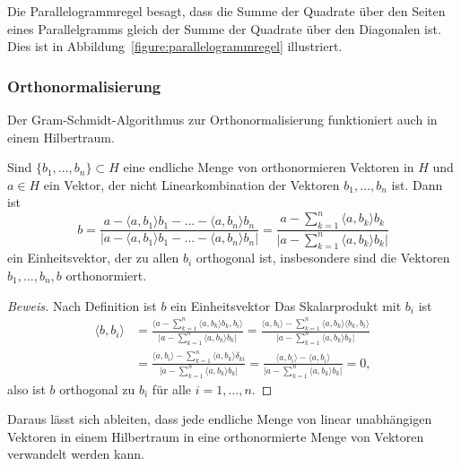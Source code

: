 Die Parallelogrammregel besagt, dass die Summe der Quadrate über den
Seiten eines Parallelgramms gleich der Summe der Quadrate über den
Diagonalen ist.
Dies ist in Abbildung~\ref{figure:parallelogrammregel} illustriert.

\subsubsection{Orthonormalisierung}
%
Der Gram-Schmidt-Algorithmus zur Orthonormalisierung funktioniert auch
%
in einem Hilbertraum.

\begin{satz}
\label{satz:orthonormierung}
Sind $\{b_1,\dots,b_n\}\subset H$ eine endliche Menge von orthonormieren
Vektoren in $H$ und $a\in H$ ein Vektor, der nicht Linearkombination
der Vektoren $b_1,\dots,b_n$ ist.
Dann ist
\[
b
=
\frac{a-\langle a,b_1\rangle b_1-\dots-\langle a,b_n\rangle b_n}%
{|a-\langle a,b_1\rangle b_1-\dots-\langle a,b_n\rangle b_n|}
=
\frac{a-\displaystyle\sum_{k=1}^n \langle a,b_k\rangle b_k}%
{\biggl| a-\displaystyle\sum_{k=1}^n \langle a,b_k\rangle b_k\biggr|}
\]
ein Einheitsvektor, der zu allen $b_i$ orthogonal ist, insbesondere sind
die Vektoren
$b_1,\dots,b_n,b$ orthonormiert.
\end{satz}

\begin{proof}[Beweis]
Nach Definition ist $b$ ein Einheitsvektor
Das Skalarprodukt mit $b_i$ ist
\begin{align*}
\langle b, b_i\rangle
&=
\frac{\biggl\langle a-\displaystyle\sum_{k=1}^n \langle a,b_k\rangle b_k,b_i\biggr\rangle}%
{\biggl| a-\displaystyle\sum_{k=1}^n \langle a,b_k\rangle b_k\biggr|}
=
\frac{\langle a,b_i\rangle-\displaystyle\sum_{k=1}^n \langle a,b_k\rangle \langle b_k,b_i\rangle}%
{\biggl| a-\displaystyle\sum_{k=1}^n \langle a,b_k\rangle b_k\biggr|}
\\
&=
\frac{\langle a,b_i\rangle-\displaystyle\sum_{k=1}^n \langle a,b_k\rangle \delta_{ki}}%
{\biggl| a-\displaystyle\sum_{k=1}^n \langle a,b_k\rangle b_k\biggr|}
=
\frac{\langle a,b_i\rangle-\langle a,b_i\rangle}%
{\biggl| a-\displaystyle\sum_{k=1}^n \langle a,b_k\rangle b_k\biggr|}
=0,
\end{align*}
also ist $b$ orthogonal zu $b_i$ für alle $i=1,\dots,n$.
\end{proof}

Daraus lässt sich ableiten, dass jede endliche Menge von linear unabhängigen
Vektoren in einem Hilbertraum in eine orthonormierte Menge von Vektoren
verwandelt werden kann.

